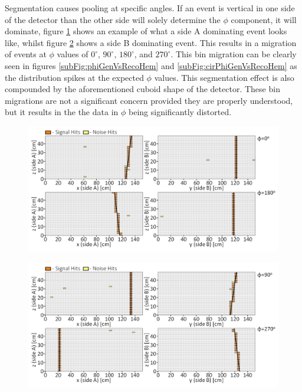 Segmentation causes pooling at specific angles. If an event is vertical in one side of the detector than the other side will solely determine the $\phi$ component, it will dominate, figure  \ref{fig:cosmicBinMigrationSideA} shows an example of what a side A dominating event looks like, whilst figure \ref{fig:cosmicBinMigrationSideB} shows a side B dominating event. This results in a migration of events at $\phi$ values of $0^\circ$, $90^\circ$, $180^\circ$, and $270^\circ$. This bin migration can be clearly seen in figures \ref{subFig:phiGenVsRecoHem} and \ref{subFig:cirPhiGenVsRecoHem} as the distribution spikes at the expected $\phi$ values. This segmentation effect is also compounded by the aforementioned cuboid shape of the detector. These bin migrations are not a significant concern provided they are properly understood, but it results in the the data in $\phi$ being significantly distorted.  
 
\begin{figure}[!h]
 \centering
 \includegraphics[width=\linewidth]{Chapter6/Figs/Raster/phiSideABinMigrationMedText.png}
 \label{fig:cosmicBinMigrationSideA}
\end{figure}

\begin{figure}[!h]
 \centering
 \includegraphics[width=\linewidth]{Chapter6/Figs/Raster/phiSideBBinMigrationMedText.png}
 \label{fig:cosmicBinMigrationSideB}
\end{figure}

